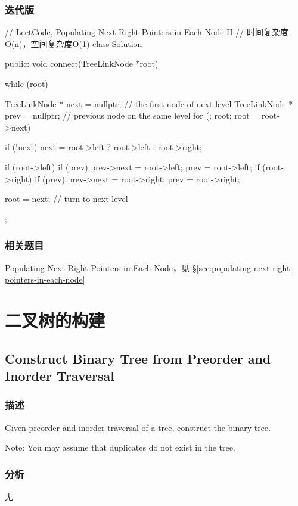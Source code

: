 \subsubsection{迭代版}
\begin{Code}
// LeetCode, Populating Next Right Pointers in Each Node II
// 时间复杂度O(n)，空间复杂度O(1)
class Solution {
public:
    void connect(TreeLinkNode *root) {
        while (root) {
            TreeLinkNode * next = nullptr; // the first node of next level
            TreeLinkNode * prev = nullptr; // previous node on the same level
            for (; root; root = root->next) {
                if (!next) next = root->left ? root->left : root->right;

                if (root->left) {
                    if (prev) prev->next = root->left;
                    prev = root->left;
                }
                if (root->right) {
                    if (prev) prev->next = root->right;
                    prev = root->right;
                }
            }
            root = next; // turn to next level
        }
    }
};
\end{Code}


\subsubsection{相关题目}
\begindot
\item Populating Next Right Pointers in Each Node，见 \S \ref{sec:populating-next-right-pointers-in-each-node}
\myenddot


\section{二叉树的构建} %


\subsection{Construct Binary Tree from Preorder and Inorder Traversal}
\label{sec:construct-binary-tree-from-preorder-and-inorder-traversal}


\subsubsection{描述}
Given preorder and inorder traversal of a tree, construct the binary tree.

Note:
You may assume that duplicates do not exist in the tree.


\subsubsection{分析}
无


